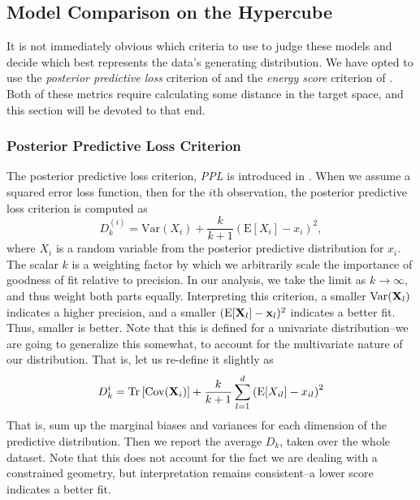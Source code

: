 \subsection{Model Comparison on the Hypercube}
It is not immediately obvious which criteria to use to judge these models and decide which best
  represents the data's generating distribution.  We have opted to use the
  \emph{posterior predictive loss} criterion of \cite{gelfand1998} and the
  \emph{energy score} criterion of \cite{gneiting2007}.  Both of these
  metrics require calculating some distance in the target space, and this section will be devoted
  to that end.

\subsubsection{Posterior Predictive Loss Criterion}
The posterior predictive loss criterion, \emph{PPL} is introduced in \cite{gelfand1998}.  When we 
  assume a squared error loss function, then for the $i$th observation, the posterior predictive
  loss criterion is computed as
  \begin{equation}
    \label{eq:ppl}
    D_{k}^{(i)} = \text{Var}(X_i) + \frac{k}{k + 1}\left(\text{E}[X_i] - x_i\right)^2,
  \end{equation}
  where $X_i$ is a random variable from the posterior predictive distribution for $x_i$.  The
  scalar $k$ is a weighting factor by which we arbitrarily scale the importance of goodness of fit
  relative to precision.  In our analysis, we take the limit as $k\to\infty$, and thus weight both
  parts equally.  Interpreting this criterion, a smaller $\text{Var}({\bf X}_l)$ indicates a higher
  precision, and a smaller $(\text{E}[{\bf X}_l] - {\bf x}_l)^2$  indicates a better fit.  Thus,
  smaller is better.  Note that this is defined for a univariate distribution--we are going to
  generalize this somewhat, to account for the multivariate nature of our distribution.  That is,
  let us re-define it slightly as
  \begin{equation}
    \label{eq:ppl2}
    D_k^{i} = \operatorname{Tr}\left[\text{Cov}({\bf X}_i)\right] +
        \frac{k}{k+1}\sum_{l=1}^d\left(\text{E}[X_{il}] - x_{il}\right)^2
  \end{equation}
  That is, sum up the marginal biases and variances for each dimension of the predictive distribution.
  Then we report the average $D_k$, taken over the whole dataset. Note that this does not account
  for the fact we are dealing with a constrained geometry, but interpretation remains consistent--a
  lower score indicates a better fit.

